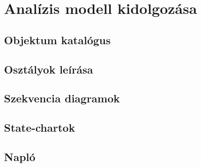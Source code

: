



\fedlap

\addtocounter{section}{2}
\section{Analízis modell kidolgozása}

\subsection{Objektum katalógus}

\subsection{Osztályok leírása}

\subsection{Szekvencia diagramok}

\subsection{State-chartok}

\subsection{Napló}

